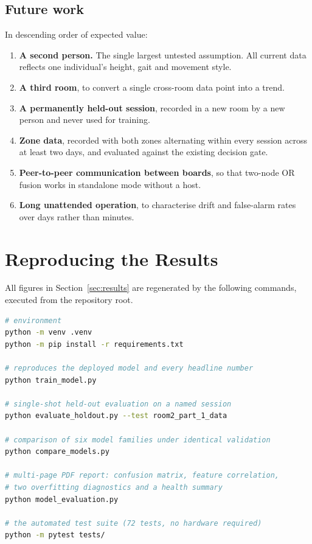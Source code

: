 \documentclass[11pt,a4paper]{article}
\begin{document}
\subsection{Future work}

In descending order of expected value:

\begin{enumerate}[leftmargin=1.6em, itemsep=3pt]
  \item \textbf{A second person.} The single largest untested assumption. All
        current data reflects one individual's height, gait and movement style.
  \item \textbf{A third room}, to convert a single cross-room data point into a
        trend.
  \item \textbf{A permanently held-out session}, recorded in a new room by a new
        person and never used for training.
  \item \textbf{Zone data}, recorded with both zones alternating within every
        session across at least two days, and evaluated against the existing
        decision gate.
  \item \textbf{Peer-to-peer communication between boards}, so that two-node OR
        fusion works in standalone mode without a host.
  \item \textbf{Long unattended operation}, to characterise drift and
        false-alarm rates over days rather than minutes.
\end{enumerate}

\appendix
\section{Reproducing the Results}

All figures in Section~\ref{sec:results} are regenerated by the following
commands, executed from the repository root.

\begin{lstlisting}[language=bash, caption={Reproduction commands.}]
# environment
python -m venv .venv
python -m pip install -r requirements.txt

# reproduces the deployed model and every headline number
python train_model.py

# single-shot held-out evaluation on a named session
python evaluate_holdout.py --test room2_part_1_data

# comparison of six model families under identical validation
python compare_models.py

# multi-page PDF report: confusion matrix, feature correlation,
# two overfitting diagnostics and a health summary
python model_evaluation.py

# the automated test suite (72 tests, no hardware required)
python -m pytest tests/
\end{lstlisting}
\end{document}
